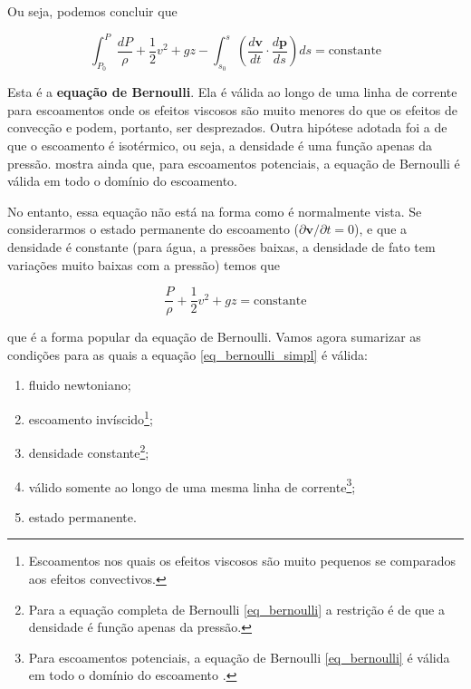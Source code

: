 \documentclass[a4paper,portuguese,10pt]{article}
\renewcommand{\D}{\partial}
\renewcommand{\vec}{\mathbf}
\begin{document}
Ou seja, podemos concluir que

\begin{equation}
  \int_{P_0}^P\frac{dP}{\rho} + \frac{1}{2}v^2 + gz - \int_{s_0}^s\left(\frac{d\vec{v}}{dt}\cdot\frac{d\vec{p}}{ds}\right)ds = \text{constante}
  \label{eq_bernoulli}
\end{equation}

Esta é a \textbf{equação de Bernoulli}. Ela é válida ao longo de uma linha de corrente para escoamentos onde os efeitos viscosos são muito menores do que os efeitos de convecção e podem, portanto, ser desprezados. Outra hipótese adotada foi a de que o escoamento é isotérmico, ou seja, a densidade é uma função apenas da pressão. \citet{SLATTERY99} mostra ainda que, para escoamentos potenciais, a equação de Bernoulli é válida em todo o domínio do escoamento.

No entanto, essa equação não está na forma como é normalmente vista. Se considerarmos o estado permanente do escoamento ($\D\vec{v}/\D t = 0$), e que a densidade é constante (para água, a pressões baixas, a densidade de fato tem variações muito baixas com a pressão) temos que

\begin{equation}
  \frac{P}{\rho} + \frac{1}{2}v^2 + gz = \text{constante}
  \label{eq_bernoulli_simpl}
\end{equation}

que é a forma popular da equação de Bernoulli. Vamos agora sumarizar as condições para as quais a equação \ref{eq_bernoulli_simpl} é válida:

\begin{enumerate}
  \item fluido newtoniano;
  \item escoamento invíscido\footnote{Escoamentos nos quais os efeitos viscosos são muito pequenos se comparados aos efeitos convectivos.};
  \item densidade constante\footnote{Para a equação completa de Bernoulli \ref{eq_bernoulli} a restrição é de que a densidade é função apenas da pressão.};
  \item válido somente ao longo de uma mesma linha de corrente\footnote{Para escoamentos potenciais, a equação de Bernoulli \ref{eq_bernoulli} é válida em todo o domínio do escoamento \cite{SLATTERY99}.};
  \item estado permanente.
\end{enumerate}

\singlespacing



\end{document}
